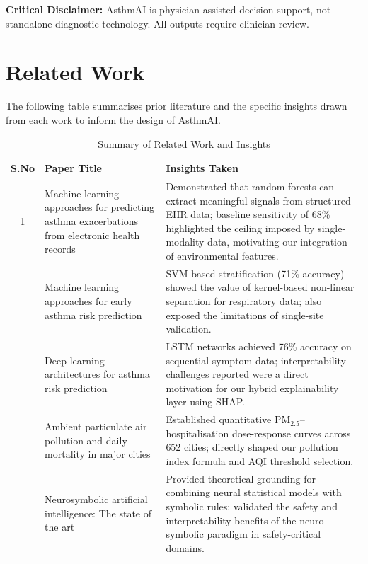 \documentclass[11pt,a4paper]{article}
\begin{document}
\noindent\textbf{Critical Disclaimer:} AsthmAI is physician-assisted decision support,
not standalone diagnostic technology. All outputs require clinician review.

\section{Related Work}

The following table summarises prior literature and the specific insights drawn from
each work to inform the design of AsthmAI.

\begin{table}[H]
\vspace{-4pt}
\centering
\caption{Summary of Related Work and Insights}
\label{tab:related}
\begin{tabularx}{\textwidth}{c p{4.5cm} X}
\toprule
\textbf{S.No} & \textbf{Paper Title} & \textbf{Insights Taken} \\
\midrule
1 & Machine learning approaches for predicting asthma exacerbations from electronic health records \cite{patel2019} &
Demonstrated that random forests can extract meaningful signals from structured EHR data; baseline sensitivity of 68\% highlighted the ceiling imposed by single-modality data, motivating our integration of environmental features. \\
\addlinespace
2 & Machine learning approaches for early asthma risk prediction \cite{finkelstein2017} &
SVM-based stratification (71\% accuracy) showed the value of kernel-based non-linear separation for respiratory data; also exposed the limitations of single-site validation. \\
\addlinespace
3 & Deep learning architectures for asthma risk prediction \cite{xiang2020} &
LSTM networks achieved 76\% accuracy on sequential symptom data; interpretability challenges reported were a direct motivation for our hybrid explainability layer using SHAP. \\
\addlinespace
4 & Ambient particulate air pollution and daily mortality in major cities \cite{liu2019} &
Established quantitative PM$_{2.5}$--hospitalisation dose-response curves across 652 cities; directly shaped our pollution index formula and AQI threshold selection. \\
\addlinespace
5 & Neurosymbolic artificial intelligence: The state of the art \cite{garcez2020} &
Provided theoretical grounding for combining neural statistical models with symbolic rules; validated the safety and interpretability benefits of the neuro-symbolic paradigm in safety-critical domains. \\

\end{tabularx}
\end{table}
\end{document}
